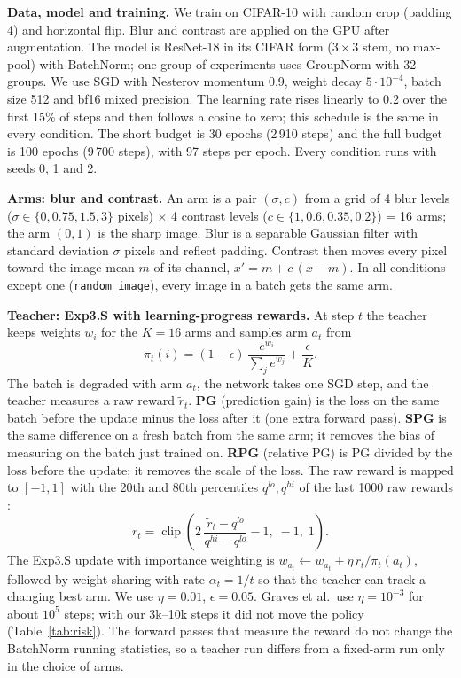\documentclass[a4paper,12pt]{report}
\newcommand{\cond}[1]{\texttt{#1}}
\begin{document}
\textbf{Data, model and training.} We train on CIFAR-10 with random crop (padding 4) and horizontal flip. Blur and contrast are applied on the GPU after augmentation. The model is ResNet-18 in its CIFAR form ($3\times3$ stem, no max-pool) with BatchNorm; one group of experiments uses GroupNorm with 32 groups. We use SGD with Nesterov momentum 0.9, weight decay $5\cdot10^{-4}$, batch size 512 and bf16 mixed precision. The learning rate rises linearly to 0.2 over the first 15\% of steps and then follows a cosine to zero; this schedule is the same in every condition. The short budget is 30 epochs (2\,910 steps) and the full budget is 100 epochs (9\,700 steps), with 97 steps per epoch. Every condition runs with seeds 0, 1 and 2.

\textbf{Arms: blur and contrast.} An arm is a pair $(\sigma, c)$ from a grid of 4 blur levels ($\sigma\in\{0, 0.75, 1.5, 3\}$ pixels) $\times$ 4 contrast levels ($c\in\{1, 0.6, 0.35, 0.2\}$) = 16 arms; the arm $(0,1)$ is the sharp image. Blur is a separable Gaussian filter with standard deviation $\sigma$ pixels and reflect padding. Contrast then moves every pixel toward the image mean $m$ of its channel, $x' = m + c\,(x - m)$. In all conditions except one (\cond{random\_image}), every image in a batch gets the same arm.

\textbf{Teacher: Exp3.S with learning-progress rewards.} At step $t$ the teacher keeps weights $w_i$ for the $K=16$ arms and samples arm $a_t$ from
\begin{equation}
\pi_t(i) = (1-\epsilon)\,\frac{e^{w_i}}{\sum_j e^{w_j}} + \frac{\epsilon}{K}.
\end{equation}
The batch is degraded with arm $a_t$, the network takes one SGD step, and the teacher measures a raw reward $\tilde r_t$. \textbf{PG} (prediction gain) is the loss on the same batch before the update minus the loss after it (one extra forward pass). \textbf{SPG} is the same difference on a fresh batch from the same arm; it removes the bias of measuring on the batch just trained on. \textbf{RPG} (relative PG) is PG divided by the loss before the update; it removes the scale of the loss. The raw reward is mapped to $[-1,1]$ with the 20th and 80th percentiles $q^{lo}, q^{hi}$ of the last 1000 raw rewards \cite{graves2017}:
\begin{equation}
r_t = \operatorname{clip}\!\left(2\,\frac{\tilde r_t - q^{lo}}{q^{hi}-q^{lo}} - 1,\; -1,\; 1\right).
\end{equation}
The Exp3.S update with importance weighting is $w_{a_t} \leftarrow w_{a_t} + \eta\, r_t / \pi_t(a_t)$, followed by weight sharing with rate $\alpha_t = 1/t$ so that the teacher can track a changing best arm. We use $\eta=0.01$, $\epsilon=0.05$. Graves et al.\ use $\eta=10^{-3}$ for about $10^5$ steps; with our 3k--10k steps it did not move the policy (Table~\ref{tab:risk}). The forward passes that measure the reward do not change the BatchNorm running statistics, so a teacher run differs from a fixed-arm run only in the choice of arms.
\end{document}

